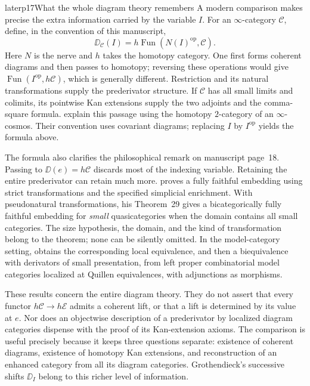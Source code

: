 \begin{dcomment}{later}{p17}{What the whole diagram theory remembers}
A modern comparison makes precise the extra information carried by the variable $I$. For an $\infty$-category $\mathcal C$, define, in the convention of this manuscript,
\[
\DD_{\mathcal C}(I)=h\operatorname{Fun}(N(I)^{\mathrm{op}},\mathcal C).
\]
Here $N$ is the nerve and $h$ takes the homotopy category. One first forms coherent diagrams and then passes to homotopy; reversing these operations would give $\operatorname{Fun}(I^{\mathrm{op}},h\mathcal C)$, which is generally different. Restriction and its natural transformations supply the prederivator structure. If $\mathcal C$ has all small limits and colimits, its pointwise Kan extensions supply the two adjoints and the comma-square formula. \citet[\S5.3, especially Proposition~5.3.9 and Remark~5.3.10]{RiehlVerity2017} explain this passage using the homotopy $2$-category of an $\infty$-cosmos. Their convention uses covariant diagrams; replacing $I$ by $I^{\mathrm{op}}$ yields the formula above.

The formula also clarifies the philosophical remark on manuscript page~18. Passing to $\DD(e)=h\mathcal C$ discards most of the indexing variable. Retaining the entire prederivator can retain much more. \citet[Theorem~19 and Corollary~20]{Arlin2020} proves a fully faithful embedding using strict transformations and the specified simplicial enrichment. With pseudonatural transformations, his Theorem~29 gives a bicategorically fully faithful embedding for \emph{small} quasicategories when the domain contains all small categories. The size hypothesis, the domain, and the kind of transformation belong to the theorem; none can be silently omitted. In the model-category setting, \citet[Theorems~3.3.2 and~3.4.4]{Renaudin2009} obtains the corresponding local equivalence, and then a biequivalence with derivators of small presentation, from left proper combinatorial model categories localized at Quillen equivalences, with adjunctions as morphisms.

These results concern the entire diagram theory. They do not assert that every functor $h\mathcal C\to h\mathcal E$ admits a coherent lift, or that a lift is determined by its value at $e$. Nor does an objectwise description of a prederivator by localized diagram categories dispense with the proof of its Kan-extension axioms. The comparison is useful precisely because it keeps three questions separate: existence of coherent diagrams, existence of homotopy Kan extensions, and reconstruction of an enhanced category from all its diagram categories. Grothendieck's successive shifts $\DD_I$ belong to this richer level of information.
\end{dcomment}

